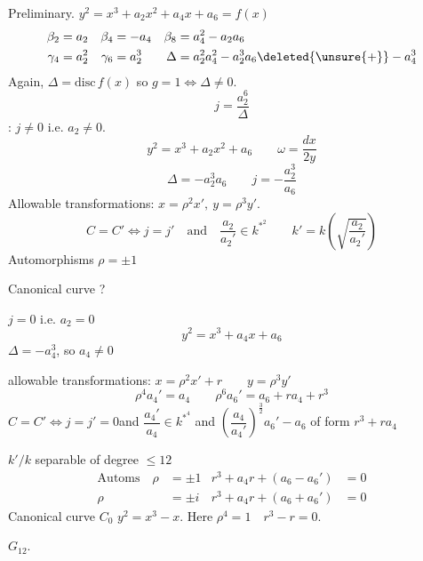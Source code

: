 \qquad Preliminary. \quad $y^2=x^3+a_2x^2+a_4x+a_6=f(x)$
\[
\begin{aligned}
\beta_2&=a_2 &\beta_4&=-a_4 &\beta_8&=a_4^2-a_2a_6\\
\gamma_4&=a_2^2 &\gamma_6&=a_2^3 &\Delta&=a_2^2a_4^2-a_2^3a_6\deleted{\unsure{+}}-a_4^3
\end{aligned}
\]
Again, $\Delta=\mathrm{disc}\,f(x)$ so $g=1\Longleftrightarrow\Delta\ne0$.
\[
j=\frac{a_2^6}{\Delta}
\]
: \quad $j\ne0$ i.e. $a_2\ne0$.
\[
\boxed{y^2=x^3+a_2x^2+a_6}\qquad \omega=\frac{dx}{2y}
\]
\[
\Delta=-a_2^3a_6\qquad j=-\frac{a_2^3}{a_6}
\]
Allowable transformations: \quad $x=\rho^2x',\ y=\rho^3y'$.
\[
C=C'\Longleftrightarrow j=j'\quad\text{and}\quad
\frac{a_2}{a_2'}\in k^{*^{2}}\qquad k'=k\left(\sqrt{\frac{a_2}{a_2'}}\right)
\]
Automorphisms \qquad $\rho=\pm1$

Canonical curve ?

 \quad $j=0$ i.e. $a_2=0$
\[
\boxed{y^2=x^3+a_4x+a_6}
\]
$\Delta=-a_4^3$, so $a_4\ne0$

allowable transformations: \qquad $x=\rho^2x'+r\qquad y=\rho^3y'$
\[
\rho^4a_4'=a_4\qquad \rho^6a_6'=a_6+ra_4+r^3
\]
$C=C'\Longleftrightarrow j=j'=0$\quad and \quad $\dfrac{a_4'}{a_4}\in k^{*^{4}}$ \quad and $\left(\dfrac{a_4}{a_4'}\right)^{\frac32}a_6'-a_6$ of form $r^3+ra_4$


$k'/k$ separable of degree $\le12$
\[
\begin{aligned}
\text{Automs}\quad \rho&=\pm1 & r^3+a_4r+(a_6-a_6')&=0\\
\rho&=\pm i & r^3+a_4r+(a_6+a_6')&=0
\end{aligned}
\]
Canonical curve $C_0$ \unsure{:} \quad $y^2=x^3-x$. Here $\rho^4=1\quad r^3-r=0$.

$G_{12}$.

